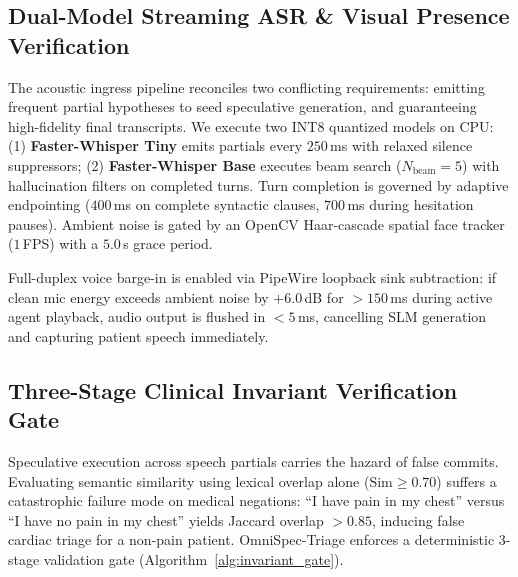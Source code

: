 \documentclass[10pt,journal,compsoc]{IEEEtran}
\begin{document}
\subsection{Dual-Model Streaming ASR \& Visual Presence Verification}
The acoustic ingress pipeline reconciles two conflicting requirements: emitting frequent partial hypotheses to seed speculative generation, and guaranteeing high-fidelity final transcripts. We execute two INT8 quantized models on CPU: (1) \textbf{Faster-Whisper Tiny} emits partials every $250$\,ms with relaxed silence suppressors; (2)
\textbf{Faster-Whisper Base} executes beam search ($N_{\text{beam}} = 5$) with hallucination filters on completed turns. Turn completion is governed by adaptive endpointing ($400$\,ms on complete syntactic clauses, $700$\,ms during hesitation pauses). Ambient noise is gated by an OpenCV Haar-cascade spatial face tracker ($1$\,FPS) with a
$5.0$\,s grace period.

Full-duplex voice barge-in is enabled via PipeWire loopback sink subtraction: if clean mic energy exceeds ambient noise by $+6.0$\,dB for $>150$\,ms during active agent playback, audio output is flushed in $<5$\,ms, cancelling SLM generation and capturing patient speech immediately.

\subsection{Three-Stage Clinical Invariant Verification Gate}
Speculative execution across speech partials carries the hazard of false commits. Evaluating semantic similarity using lexical overlap alone ($\text{Sim} \ge 0.70$) suffers a catastrophic failure mode on medical negations: ``I have pain in my chest'' versus ``I have no pain in my chest'' yields Jaccard overlap $>0.85$, inducing false
cardiac triage for a non-pain patient. OmniSpec-Triage enforces a deterministic 3-stage validation gate (Algorithm~\ref{alg:invariant_gate}).
\end{document}
